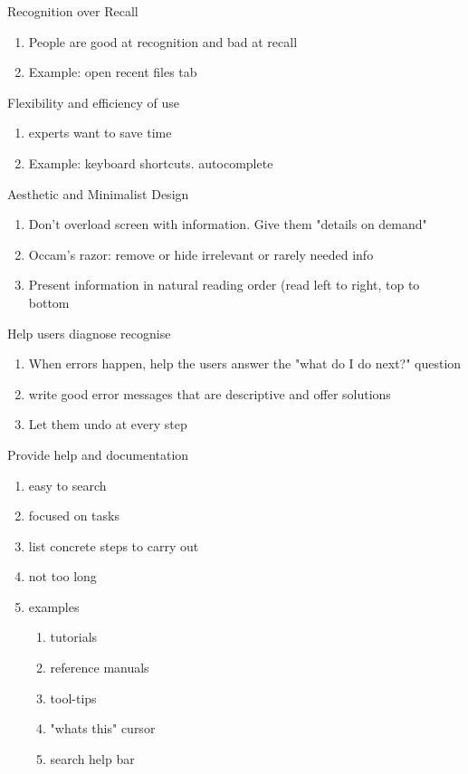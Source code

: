 \documentclass[11pt]{article}
\begin{document}
Recognition over Recall
\begin{enumerate}
    \item People are good at recognition and bad at recall
    \item Example: open recent files tab 
\end{enumerate}

Flexibility and efficiency of use
\begin{enumerate}
    \item experts want to save time
    \item Example: keyboard shortcuts. autocomplete 
\end{enumerate}

Aesthetic and Minimalist Design
\begin{enumerate}
    \item Don't overload screen with information. Give them "details on demand"
    \item Occam's razor: remove or hide irrelevant or rarely needed info
    \item Present information in natural reading order (read left to right, top to bottom
\end{enumerate}

Help users diagnose recognise 
\begin{enumerate}
    \item When errors happen, help the users answer the "what do I do next?" question
    \item write good error messages that are descriptive and offer solutions
    \item Let them undo at every step  
\end{enumerate}

Provide help and documentation
\begin{enumerate}
    \item easy to search
    \item focused on tasks
    \item list concrete steps to carry out
    \item not too long
    \item examples \begin{enumerate}
        \item tutorials
        \item reference manuals
        \item tool-tips
        \item "whats this" cursor
        \item search help bar
    \end{enumerate}
\end{enumerate}
\end{document}
